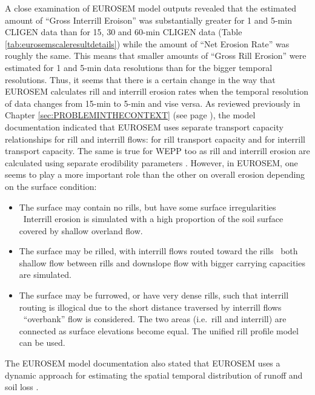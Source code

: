 A close examination of EUROSEM model outputs revealed that the estimated amount
of ``Gross Interrill Eroison'' was substantially greater for 1 and 5-min CLIGEN
data than for 15, 30 and 60-min CLIGEN data (Table
\ref{tab:eurosemscaleresultdetails}) while the amount of ``Net Erosion Rate''
was roughly the same. This means that smaller amounts of ``Gross Rill Erosion''
were estimated for 1 and 5-min data resolutions than for the bigger temporal
resolutions.
Thus, it seems that there is a certain change in the way that EUROSEM calculates
rill and interrill erosion rates when the temporal resolution of data changes
from 15-min to 5-min and vise versa.
As reviewed previously in Chapter \ref{sec:PROBLEMINTHECONTEXT} (see page
\pageref{sec:TransportCapacityOfTheFlow}), the model documentation
indicated that EUROSEM uses separate transport capacity relationships for rill
and interrill flows: \citet{govers1990-45} for rill transport capacity and
\citet{everaert1991-513} for interrill transport capacity. The same is true
for WEPP too as rill and interrill erosion are calculated using separate
erodibility parameters \citep{flanagan1995-usda}. However, in EUROSEM, one seems
to play a more important role than the other on overall erosion depending on the
surface condition:

\begin{itemize}
  \item The surface may contain no rills, but have some surface irregularities
    \subitem \textrightarrow\ Interrill erosion is simulated with a high
proportion of the soil surface covered by shallow overland flow.
  \item The surface may be rilled, with interrill flows routed toward the rills
    \subitem \textrightarrow\ both shallow flow between rills and downslope flow
with bigger carrying capacities are simulated.
  \item The surface may be furrowed, or have very dense rills, such that
interrill routing is illogical due to the short distance traversed by interrill
flows
    \subitem \textrightarrow\ ``overbank'' flow is considered. The two areas
(i.e.\ rill and interrill) are connected as surface elevations become equal. The
unified rill profile model can be used.
\end{itemize}

The EUROSEM model documentation also stated that EUROSEM uses a dynamic approach
for estimating the spatial temporal distribution of runoff and soil loss
\citep{morgan1998-europeansoilerosion}.

